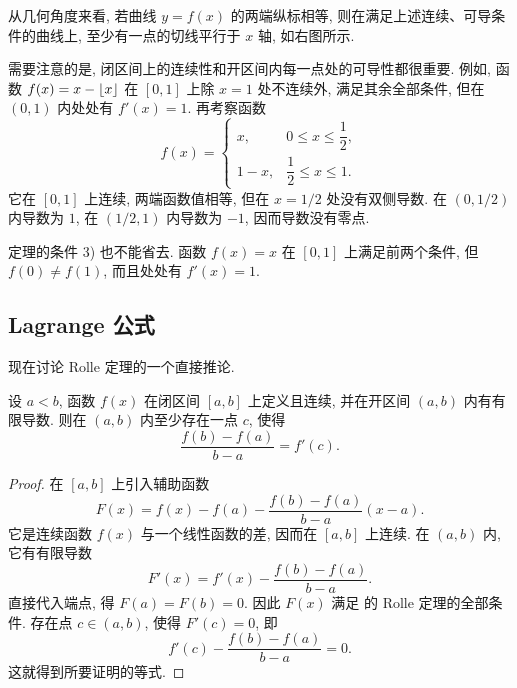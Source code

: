 \begin{figure}
    \vspace{-0.8cm}
\centering
{}
\end{figure}
从几何角度来看, 若曲线 $y=f(x)$ 的两端纵标相等,
则在满足上述连续、可导条件的曲线上, 至少有一点的切线平行于 $x$ 轴, 如右图所示.

需要注意的是, 闭区间上的连续性和开区间内每一点处的可导性都很重要.
例如, 函数 $f(x)=x-\left\lfloor x \right\rfloor$ 在 $[0,1]$ 上除 $x=1$ 处不连续外,
满足其余全部条件, 但在 $(0,1)$ 内处处有 $f'(x)=1$.
再考察函数
$$
f(x)=
\begin{cases}
x,&0\leq x\leq\dfrac12,\\
1-x,&\dfrac12\leq x\leq1.
\end{cases}
$$
它在 $[0,1]$ 上连续, 两端函数值相等,
但在 $x=1/2$ 处没有双侧导数.
在 $(0,1/2)$ 内导数为 $1$, 在 $(1/2,1)$ 内导数为 $-1$, 因而导数没有零点.

定理的条件 3) 也不能省去.
函数 $f(x)=x$ 在 $[0,1]$ 上满足前两个条件, 但 $f(0)\neq f(1)$,
而且处处有 $f'(x)=1$.

\subsection{Lagrange 公式}\label{subsec:112}
现在讨论 Rolle 定理的一个直接推论.

\begin{theorem}[Lagrange]\label{thm:lagrange_mean_value}
设 $a<b$, 函数 $f(x)$ 在闭区间 $[a,b]$ 上定义且连续,
并在开区间 $(a,b)$ 内有有限导数.
则在 $(a,b)$ 内至少存在一点 $c$, 使得
\begin{equation}\label{eq:lagrange_mean_value_formula}
\frac{f(b)-f(a)}{b-a}=f'(c).
\end{equation}
\end{theorem}
\begin{proof}
\enlargethispage{\baselineskip}
在 $[a,b]$ 上引入辅助函数
$$
F(x)=f(x)-f(a)-\frac{f(b)-f(a)}{b-a}(x-a).
$$
它是连续函数 $f(x)$ 与一个线性函数的差, 因而在 $[a,b]$ 上连续.
在 $(a,b)$ 内, 它有有限导数
$$
F'(x)=f'(x)-\frac{f(b)-f(a)}{b-a}.
$$
直接代入端点, 得 $F(a)=F(b)=0$.
因此 $F(x)$ 满足  的 Rolle 定理的全部条件.
存在点 $c\in(a,b)$, 使得 $F'(c)=0$, 即
$$
f'(c)-\frac{f(b)-f(a)}{b-a}=0.
$$
这就得到所要证明的等式.
\end{proof}

